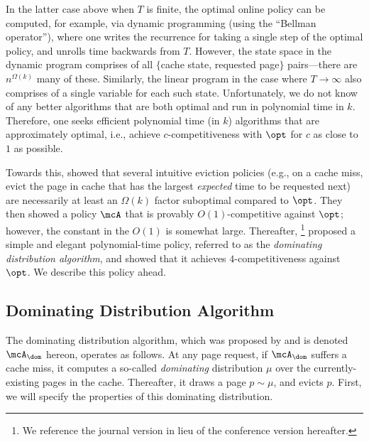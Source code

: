 \documentclass[11pt]{article}
\begin{document}
In the latter case above when $T$ is finite, the optimal online policy can be computed, for example, via dynamic programming (using the ``Bellman operator''), where one writes the recurrence for taking a single step of the optimal policy, and unrolls time backwards from $T$. However, the state space in the dynamic program comprises of all $\{$cache state, requested page$\}$ pairs---there are $n^{\Omega(k)}$ many of these. Similarly, the linear program in the case where $T \to \infty$ also comprises of a single variable for each such state. Unfortunately, we do not know of any better algorithms that are both optimal and run in polynomial time in $k$. Therefore, one seeks efficient polynomial time (in $k$) algorithms that are approximately optimal, i.e., achieve $c$-competitiveness with $\opt$ for $c$ as close to $1$ as possible.

Towards this, \cite{karlin1992markov} showed that several intuitive eviction policies (e.g., on a cache miss, evict the page in cache that has the largest \textit{expected} time to be requested next) are necessarily at least an $\Omega(k)$ factor suboptimal compared to $\opt$. They then showed a policy $\mcA$ that is provably $O(1)$-competitive against $\opt$; however, the constant in the $O(1)$ is somewhat large. Thereafter, \cite{lund1999paging}\footnote{We reference the journal version \citep{lund1999paging} in lieu of the conference version \citep{lund1994ip} hereafter.} proposed a simple and elegant polynomial-time policy, referred to as the \textit{dominating distribution algorithm}, and showed that it achieves $4$-competitiveness against $\opt$. We describe this policy ahead.

\subsection{Dominating Distribution Algorithm}
\label{sec:dominating-distribution}

The dominating distribution algorithm, which was proposed by \cite{lund1999paging} and is denoted $\mcA_\dom$ hereon, operates as follows. At any page request, if $\mcA_\dom$ suffers a cache miss, it computes a so-called \textit{dominating} distribution $\mu$ over the currently-existing pages in the cache. Thereafter, it draws a page $p \sim \mu$, and evicts $p$. First, we will specify the properties of this dominating distribution. 
\end{document}
